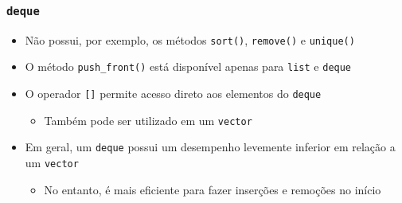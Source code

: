 \documentclass[xcolor={dvipsnames,table},aspectratio=169]{beamer}
\begin{document}
\begin{frame}\frametitle{\texttt{deque}}
\begin{itemize}
	\item Não possui, por exemplo, os métodos \texttt{sort()}, \texttt{remove()} e \texttt{unique()}
	\item O método \texttt{push\_front()} está disponível apenas para \texttt{list} e \texttt{deque}
	\item O operador \texttt{[]} permite acesso direto aos elementos do \texttt{deque}
	\begin{itemize}
		\item Também pode ser utilizado em um \texttt{vector}
	\end{itemize}
	\item Em geral, um \texttt{deque} possui um desempenho levemente inferior em relação a um \texttt{vector}
	\begin{itemize}
		\item No entanto, é mais eficiente para fazer inserções e remoções no início
	\end{itemize}
\end{itemize}
\end{frame}
\end{document}
